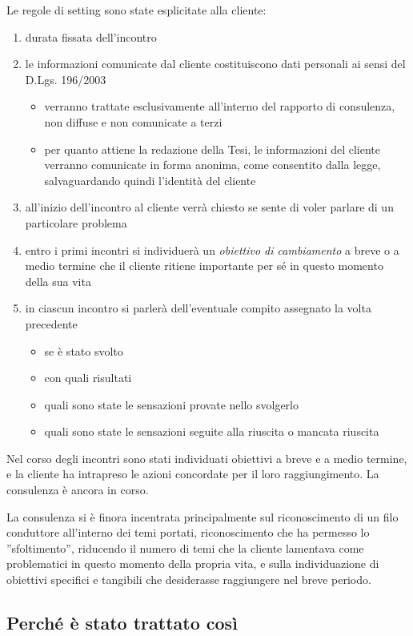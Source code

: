 Le regole di setting sono state esplicitate alla cliente:
\begin{enumerate}
\item durata fissata dell'incontro
\item le informazioni comunicate dal cliente costituiscono dati personali ai sensi del D.Lgs. 196/2003
\begin{itemize}
\item verranno trattate esclusivamente all'interno del rapporto di consulenza, non diffuse e non comunicate a terzi
\item per quanto attiene la redazione della Tesi, le informazioni del cliente verranno comunicate in forma anonima, come consentito dalla legge, salvaguardando quindi l'identità del cliente
\end{itemize} 
\item all'inizio dell'incontro al cliente verrà chiesto se sente di voler parlare di un particolare problema
\item entro i primi incontri si individuerà un \emph{obiettivo di cambiamento} a breve o a medio termine che il cliente ritiene importante per sé in questo momento della sua vita
\item in ciascun incontro si parlerà dell'eventuale compito assegnato la volta precedente
\begin{itemize}
\item se è stato svolto
\item con quali risultati
\item quali sono state le sensazioni provate nello svolgerlo
\item quali sono state le sensazioni seguite alla riuscita o mancata riuscita
\end{itemize}
\end{enumerate}

Nel corso degli incontri sono stati individuati obiettivi a breve e a medio termine, e la cliente ha intrapreso le azioni concordate per il loro raggiungimento. La consulenza è ancora in corso.

La consulenza si è finora incentrata principalmente sul riconoscimento di un filo conduttore all'interno dei temi portati, riconoscimento che ha permesso lo ''sfoltimento'', riducendo il numero di temi che la cliente lamentava come problematici in questo momento della propria vita, e sulla individuazione di obiettivi specifici e tangibili che desiderasse raggiungere nel breve periodo.

\subsection{Perché è stato trattato così}
\label{ss:perche}

